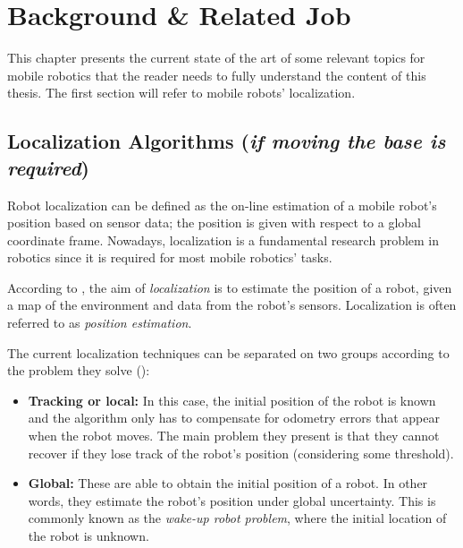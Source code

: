 

\chapter{\textbf{Background \&  Related Job}}

This chapter presents the current state of the art of some relevant topics for mobile robotics that the reader needs to fully understand the content of this thesis. The first section will refer to mobile robots' localization.

\section{Localization Algorithms (\textit{if moving the base is required})}

Robot localization can be defined as the on-line estimation of a mobile robot's position based on sensor data; the position is given with respect to a global coordinate frame. Nowadays, localization is a fundamental research problem in robotics since it is required for most mobile robotics' tasks.

According to \citet{Markov}, the aim of \textit{localization} is to estimate the position of a robot, given a map of the environment and data from the robot's sensors. Localization is often referred to as \textit{position estimation}.

The current localization techniques can be separated on two groups according to the problem they solve (\citep{Markov}):
\begin{itemize}
	\item \textbf{Tracking or local:} In this case, the initial position of the robot is known and the algorithm only has to compensate for odometry errors that appear when the robot moves. The main problem they present is that they cannot recover if they lose track of the robot's position (considering some threshold).
	\item \textbf{Global:} These are able to obtain the initial position of a robot. In other words, they estimate the robot's position under global uncertainty. This is commonly known as the \textit{wake-up robot problem}, where the initial location of the robot is unknown.
\end{itemize}

